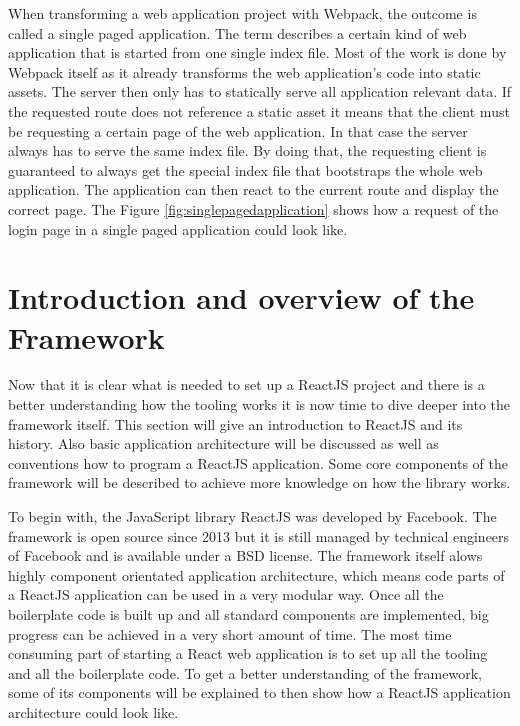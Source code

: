 When transforming a web application project with Webpack, the outcome is called a single paged application. The term describes a certain kind of web application that is started from one single index file. Most of the work is done by Webpack itself as it already transforms the web application's code into static assets. The server then only has to statically serve all application relevant data. If the requested route does not reference a static asset it means that the client must be requesting a certain page of the web application. In that case the server always has to serve the same index file. By doing that, the requesting client is guaranteed to always get the special index file that bootstraps the whole web application. The application can then react to the current route and display the correct page. The Figure \ref{fig:singlepagedapplication} shows how a request of the login page in a single paged application could look like.


\section{Introduction and overview of the Framework}

Now that it is clear what is needed to set up a ReactJS project and there is a better understanding how the tooling works it is now time to dive deeper into the framework itself. This section will give an introduction to ReactJS and its history. Also basic application architecture will be discussed as well as conventions how to program a ReactJS application. Some core components of the framework will be described to achieve more knowledge on how the library works. 

To begin with, the JavaScript library ReactJS was developed by Facebook. The framework is open source since 2013 but it is still managed by technical engineers of Facebook and is available under a BSD license. The framework itself alows highly component orientated application architecture, which means code parts of a ReactJS application can be used in a very modular way. Once all the boilerplate code is built up and all standard components are implemented, big progress can be achieved in a very short amount of time. The most time consuming part of starting a React web application is to set up all the tooling and all the boilerplate code. To get a better understanding of the framework, some of its components will be explained to then show how a ReactJS application architecture could look like.

